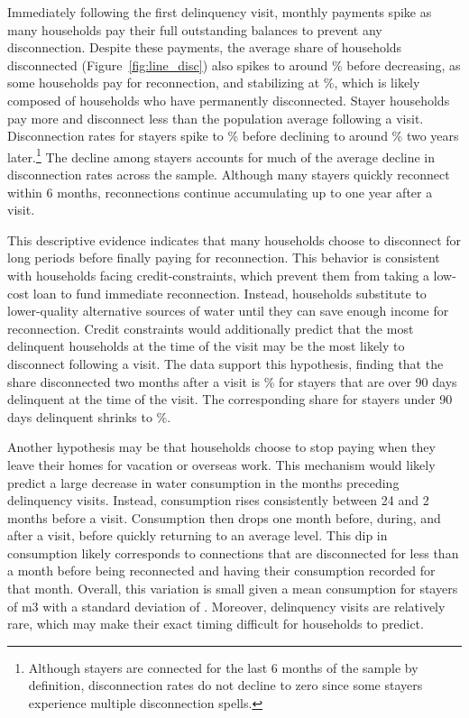 \documentclass[12pt]{article}
\begin{document}
Immediately following the first delinquency visit, monthly payments spike as many households pay their full outstanding balances to prevent any disconnection.  Despite these payments, the average share of households disconnected (Figure~\ref{fig:line_disc}) also spikes to around \unskip\% before decreasing, as some households pay for reconnection, and stabilizing at \unskip\%, which is likely composed of households who have permanently disconnected.  Stayer households pay more and disconnect less than the population average following a visit.  Disconnection rates for stayers spike to \unskip\% before declining to around \unskip\% two years later.\footnote{Although stayers are connected for the last 6 months of the sample by definition, disconnection rates do not decline to zero since some stayers experience multiple disconnection spells.}  The decline among stayers accounts for much of the average decline in disconnection rates across the sample.  Although many stayers quickly reconnect within 6 months, reconnections continue accumulating up to one year after a visit.  

This descriptive evidence indicates that many households choose to disconnect for long periods before finally paying for reconnection.  This behavior is consistent with households facing credit-constraints, which prevent them from taking a low-cost loan to fund immediate reconnection.  Instead, households substitute to lower-quality alternative sources of water until they can save enough income for reconnection.  Credit constraints would additionally predict that the most delinquent households at the time of the visit may be the most likely to disconnect following a visit.  The data support this hypothesis, finding that the share disconnected two months after a visit is \unskip\% for stayers that are over 90 days delinquent at the time of the visit.  The corresponding share for stayers under 90 days delinquent shrinks to \unskip\%.

Another hypothesis may be that households choose to stop paying when they leave their homes for vacation or overseas work.  This mechanism would likely predict a large decrease in water consumption in the months preceding delinquency visits.  Instead, consumption rises consistently between 24 and 2 months before a visit.  Consumption then drops one month before, during, and after a visit, before quickly returning to an average level.  This dip in consumption likely corresponds to connections that are disconnected for less than a month before being reconnected and having their consumption recorded for that month.  Overall, this variation is small given a mean consumption for stayers of m3 with a standard deviation of \unskip.  Moreover, delinquency visits are relatively rare, which may make their exact timing difficult for households to predict.  
\end{document}
